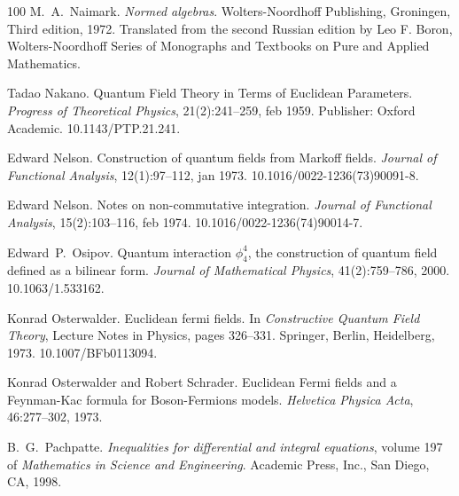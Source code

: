 \documentclass{article}
\newcommand{\tmtextit}[1]{{\itshape{#1}}}
\begin{document}
\begin{thebibliography}{100}
  M.~A.~Naimark. {\newblock}\tmtextit{Normed algebras}.
  {\newblock}Wolters-Noordhoff Publishing, Groningen, Third  edition, 1972.
  {\newblock}Translated from the second Russian edition by Leo F. Boron,
  Wolters-Noordhoff Series of Monographs and Textbooks on Pure and Applied
  Mathematics.{\newblock}
  
  Tadao Nakano. {\newblock}Quantum Field
  Theory in Terms of Euclidean Parameters. {\newblock}\tmtextit{Progress of
  Theoretical Physics}, 21(2):241--259, feb 1959. {\newblock}Publisher: Oxford
  Academic.
  \href{https://doi.org/10.1143/PTP.21.241}{}10.1143/PTP.21.241.{\newblock}
  
  Edward Nelson.
  {\newblock}Construction of quantum fields from Markoff fields.
  {\newblock}\tmtextit{Journal of Functional Analysis}, 12(1):97--112, jan
  1973.
  {\newblock}\href{Https://doi.org/10.1016/0022-1236(73)90091-8}{}10.1016/0022-1236(73)90091-8.{\newblock}
  
  Edward Nelson. {\newblock}Notes on
  non-commutative integration. {\newblock}\tmtextit{Journal of Functional
  Analysis}, 15(2):103--116, feb 1974.
  {\newblock}\href{Https://doi.org/10.1016/0022-1236(74)90014-7}{}10.1016/0022-1236(74)90014-7.{\newblock}
  
  Edward~P.~Osipov. {\newblock}Quantum
  interaction $\phi^4_4$, the construction of quantum field defined as a
  bilinear form. {\newblock}\tmtextit{Journal of Mathematical Physics},
  41(2):759--786, 2000.
  {\newblock}\href{Https://doi.org/10.1063/1.533162}{}10.1063/1.533162.{\newblock}
  
  Konrad Osterwalder.
  {\newblock}Euclidean fermi fields. {\newblock}In \tmtextit{Constructive
  Quantum Field Theory}, Lecture Notes in Physics,  pages  326--331. Springer,
  Berlin, Heidelberg, 1973.
  {\newblock}\href{Https://doi.org/10.1007/BFb0113094}{}10.1007/BFb0113094.{\newblock}
  
  Konrad Osterwalder  and  Robert
  Schrader. {\newblock}Euclidean Fermi fields and a Feynman-Kac formula for
  Boson-Fermions models. {\newblock}\tmtextit{Helvetica Physica Acta},
  46:277--302, 1973.{\newblock}
  
  B.~G.~Pachpatte.
  {\newblock}\tmtextit{Inequalities for differential and integral equations}, 
  volume  197  of \tmtextit{Mathematics in Science and Engineering}.
  {\newblock}Academic Press, Inc., San Diego, CA, 1998.{\newblock}
  

\end{thebibliography}
\end{document}
